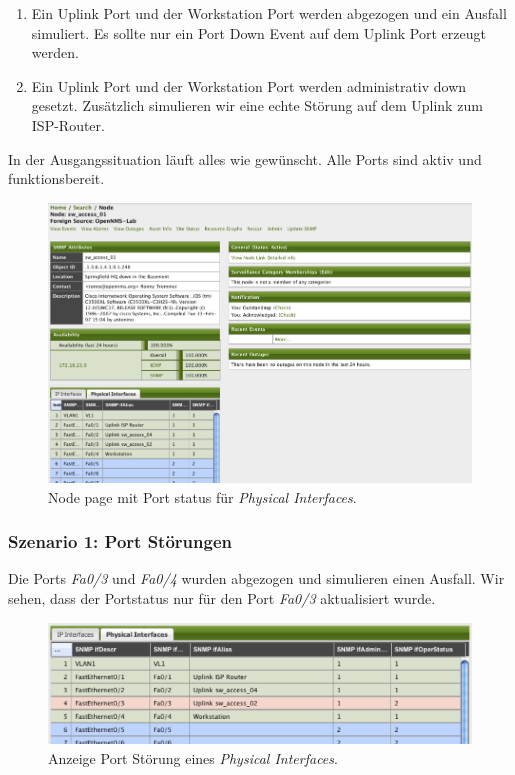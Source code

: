 \begin{enumerate}
  \item{Ein Uplink Port und der Workstation Port werden abgezogen und ein Ausfall simuliert. Es sollte nur ein Port Down Event auf dem Uplink Port erzeugt werden.}
  \item{Ein Uplink Port und der Workstation Port werden administrativ down gesetzt. Zusätzlich simulieren wir eine echte Störung auf dem Uplink zum ISP-Router.}
\end{enumerate}

In der Ausgangssituation läuft alles wie gewünscht. Alle Ports sind aktiv und funktionsbereit.

\begin{figure}[H]
	\centering
	\includegraphics[width=1.0\textwidth]{images/use-cases/monitoring-layer-2/node-page-snmpifpoller}
	\caption{Node page mit Port status für \emph{Physical Interfaces}.}
	\label{pic:node-page-snmpifpoller}
\end{figure}

\subsubsection{Szenario 1: Port Störungen}
Die Ports \emph{Fa0/3} und \emph{Fa0/4} wurden abgezogen und simulieren einen Ausfall. Wir sehen, dass der Portstatus nur für den Port \emph{Fa0/3} aktualisiert wurde.

\begin{figure}[H]
	\centering
	\includegraphics[width=1.0\textwidth]{images/use-cases/monitoring-layer-2/port-outage}
	\caption{Anzeige Port Störung eines \emph{Physical Interfaces}.}
	\label{pic:port-outage-snmpifpoller}
\end{figure}

